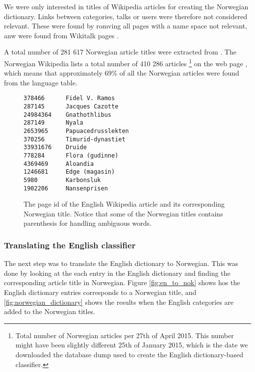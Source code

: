 We were only interested in titles of Wikipedia articles for creating the Norwegian dictionary. Links between categories, talks or users were therefore not considered relevant. These were found by romving all pages with a name space not relevant, anw were found from Wikitalk pages \cite{wiki:usingtalkpages} \cite{wiki:namespaces} \cite{wiki:navnerom}.

A total number of 281 617 Norwegian article titles were extracted from \enwikilanglinks. The Norwegian Wikipedia lists a total number of 410 286 articles \footnote{Total number of Norwegian articles per 27th of April 2015. This number might have been slightly different 25th of January 2015, which is the date we downloaded the database dump used to create the English dictionary-based classifier.} on the web page \cite{wiki:nostatistikk}, which means that approximately 69\% of all the Norwegian articles were found from the language table.





 
\begin{figure}[h]
\centering
\begin{lstlisting}
378466      Fidel V. Ramos
287145      Jacques Cazotte
24984364    Gnathothlibus
287149      Nyala
2653965     Papuacedrusslekten
370256      Timurid-dynastiet
33931676    Druide
778284      Flora (gudinne)
4369469     Aloandia
1246681     Edge (magasin)
5980        Karbonsluk
1902206     Nansenprisen
\end{lstlisting}
\caption[English page id and Norwegian article title]{The page id of the English Wikipedia article and its corresponding Norwegian title. Notice that some of the Norwegian titles contains parenthesis for handling ambiguous words. }
\label{fig:english_id_norwegian_title}
\end{figure}

\subsubsection{Translating the English classifier}
The next step was to translate the English dictionary to Norwegian. This was done by looking at the each entry in the English dictionary and finding the corresponding article title in Norwegian. Figure \ref{fig:en_to_nok} shows hos the English dictionary entries corresponds to a Norwegian title, and \ref{fig:norwegian_dictionary} shows the results when the English categories are added to the Norwegian titles. 
 
